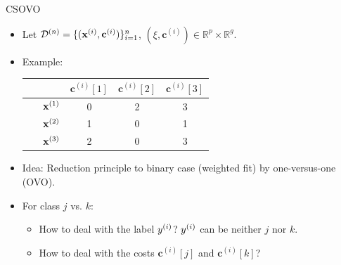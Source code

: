 \documentclass[11pt,compress,t,notes=noshow, aspectratio=169, xcolor=table]{beamer}
\newcommand{\cv}{\mathbf{c}}
\begin{document}
\begin{frame}{CSOVO}
    

    \begin{itemize}
        \item Let $\D^{(n)} = \{(\xi, \cv^{(i)})\}_{i=1}^n$, $(\xi, \cv^{(i)}) \in \mathbb{R}^p \times \mathbb{R}^g$.  
        \item Example:

        \begin{center}
            \begin{tabular}{cc|ccc}\
        	& & $\cv^{(i)}[1]$ & $\cv^{(i)}[2]$ & $\cv^{(i)}[3]$  \\
        	\hline & $\mathbf{x}^{(1)}$ & 0 & 2 & 3\\
        	& $\mathbf{x}^{(2)}$ & 1 & 0 & 1\\
                 & $\mathbf{x}^{(3)}$ & 2 & 0 & 3\\
            \end{tabular}
        \end{center}
        
        
        \item Idea: Reduction principle to binary case (weighted fit) by one-versus-one (OVO). 
        
        
        \item For class $j$ vs. $k$:
        \begin{itemize}
            \item How to deal with the label $y^{(i)}$? $y^{(i)}$ can be neither $j$ nor $k$.
            \vspace{5pt}
            
            \item How to deal with the costs $\cv^{(i)}[j]$ and $\cv^{(i)}[k]$?
            
        \end{itemize}
            
    \end{itemize}

\end{frame}
\end{document}
